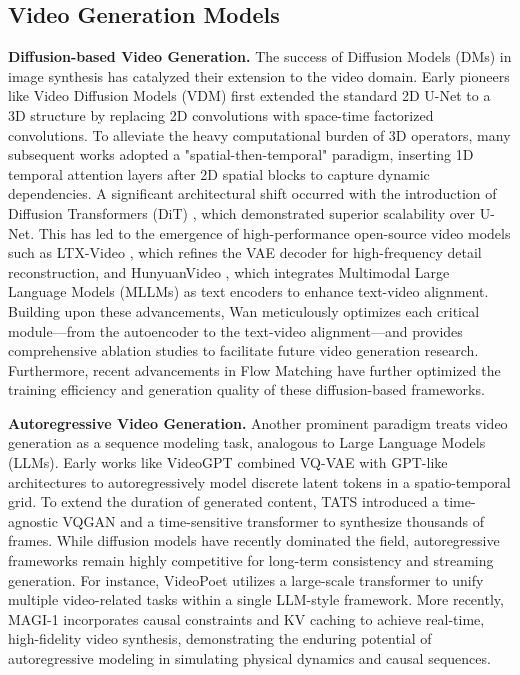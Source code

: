 \documentclass{llmxive}
\begin{document}
\subsection{Video Generation Models}
\textbf{Diffusion-based Video Generation.}
The success of Diffusion Models (DMs) \cite{ho2020denoising} in image synthesis has catalyzed their extension to the video domain. Early pioneers like Video Diffusion Models (VDM) {\cite{ho2022video}} first extended the standard 2D U-Net to a 3D structure \cite{wu2026geometry} by replacing 2D convolutions with space-time factorized convolutions. To alleviate the heavy computational burden of 3D operators, many subsequent works {\cite{singer2022make, ho2022imagen, wu2023tune, zhou2022magicvideo, wang2025lavie}} adopted a "spatial-then-temporal" paradigm, inserting 1D temporal attention layers after 2D spatial blocks to capture dynamic dependencies. 
A significant architectural shift occurred with the introduction of Diffusion Transformers (DiT) {\cite{peebles2023scalable}}, which demonstrated superior scalability over U-Net. This has led to the emergence of high-performance open-source video models such as LTX-Video {\cite{hacohen2024ltx}}, which refines the VAE decoder for high-frequency detail reconstruction, and HunyuanVideo {\cite{kong2024hunyuanvideo}}, which integrates Multimodal Large Language Models (MLLMs) as text encoders to enhance text-video alignment. Building upon these advancements, Wan {\cite{wan2025}} meticulously optimizes each critical module—from the autoencoder to the text-video alignment—and provides comprehensive ablation studies to facilitate future video generation research. Furthermore, recent advancements in Flow Matching {\cite{lipman2023flowmatching}} have further optimized the training efficiency and generation quality of these diffusion-based frameworks.

\textbf{Autoregressive Video Generation.} 
Another prominent paradigm treats video generation as a sequence modeling task, analogous to Large Language Models (LLMs). Early works like VideoGPT {\cite{yan2021videogpt}} combined VQ-VAE \cite{van2017neural} with GPT-like architectures \cite{radford2018improving} to autoregressively model discrete latent tokens in a spatio-temporal grid. To extend the duration of generated content, TATS {\cite{ge2022long}} introduced a time-agnostic VQGAN and a time-sensitive transformer to synthesize thousands of frames. While diffusion models have recently dominated the field, autoregressive frameworks remain highly competitive for long-term consistency and streaming generation. For instance, VideoPoet {\cite{kondratyuk2023videopoet}} utilizes a large-scale transformer to unify multiple video-related tasks within a single LLM-style framework. More recently, MAGI-1 {\cite{teng2025magi}} incorporates causal constraints and KV caching to achieve real-time, high-fidelity video synthesis, demonstrating the enduring potential of autoregressive modeling in simulating physical dynamics and causal sequences.
\end{document}
